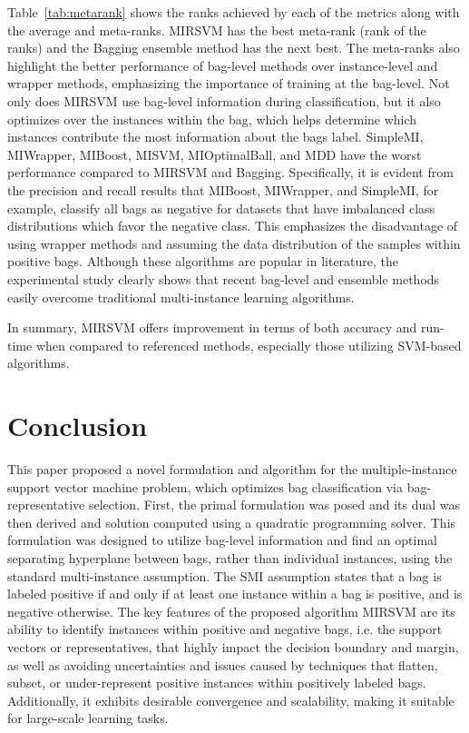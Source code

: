 \documentclass[preprint,12pt]{elsarticle}
\begin{document}
Table~\ref{tab:metarank} shows the ranks achieved by each of the metrics along with the average and meta-ranks. MIRSVM has the best meta-rank (rank of the ranks) and the Bagging ensemble method has the next best. The meta-ranks also highlight the better performance of bag-level methods over instance-level and wrapper methods, emphasizing the importance of training at the bag-level. Not only does MIRSVM use bag-level information during classification, but it also optimizes over the instances within the bag, which helps determine which instances contribute the most information about the bags label. SimpleMI, MIWrapper, MIBoost, MISVM, MIOptimalBall, and MDD have the worst performance compared to MIRSVM and Bagging. Specifically, it is evident from the precision and recall results that MIBoost, MIWrapper, and SimpleMI, for example, classify all bags as negative for datasets that have imbalanced class distributions which favor the negative class. This emphasizes the disadvantage of using wrapper methods and assuming the data distribution of the samples within positive bags. Although these algorithms are popular in literature, the experimental study clearly shows that recent bag-level and ensemble methods easily overcome traditional multi-instance learning algorithms. 

In summary, MIRSVM offers improvement in terms of both accuracy and run-time when compared to referenced methods, especially those utilizing SVM-based algorithms.

\section{Conclusion}\label{sec:conclusion}
This paper proposed a novel formulation and algorithm for the multiple-instance support vector machine problem, which optimizes bag classification via bag-representative selection. First, the primal formulation was posed and its dual was then derived and solution computed using a quadratic programming solver. This formulation was designed to utilize bag-level information and find an optimal separating hyperplane between bags, rather than individual instances, using the standard multi-instance assumption. The SMI assumption states that a bag is labeled positive if and only if at least one instance within a bag is positive, and is negative otherwise. The key features of the proposed algorithm MIRSVM are its ability to identify instances within positive and negative bags, i.e. the support vectors or representatives, that highly impact the decision boundary and margin, as well as avoiding uncertainties and issues caused by techniques that flatten, subset, or under-represent positive instances within positively labeled bags. Additionally, it exhibits desirable convergence and scalability, making it suitable for large-scale learning tasks.
\end{document}

